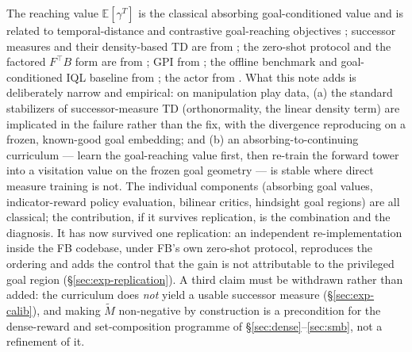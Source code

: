 \documentclass[10pt]{article}
\newcommand{\E}{\mathbb{E}}
\begin{document}
The reaching value $\E[\gamma^{T}]$ is the classical absorbing goal-conditioned value \citep{kaelbling1993learning} and is related to temporal-distance and contrastive goal-reaching objectives \citep{eysenbach2022contrastive}; successor measures and their density-based TD are from \citet{dayan1993improving,blier2021learning}; the zero-shot protocol and the factored $F^\top B$ form are from \citet{touati2021learning,touati2023does}; GPI from \citet{barreto2017successor}; the offline benchmark and goal-conditioned IQL baseline from \citet{park2024ogbench,kostrikov2021offline}; the actor from \citet{park2025flow}.
What this note adds is deliberately narrow and empirical: on manipulation play data,
(a) the standard stabilizers of successor-measure TD (orthonormality, the linear density
term) are implicated in the failure rather than the fix, with the divergence reproducing on
a frozen, known-good goal embedding; and (b) an absorbing-to-continuing curriculum ---
learn the goal-reaching value first, then re-train the forward tower into a visitation
value on the frozen goal geometry --- is stable where direct measure training is not.
The individual components (absorbing goal values, indicator-reward policy evaluation,
bilinear critics, hindsight goal regions) are all classical; the contribution, if it
survives replication, is the combination and the diagnosis.
It has now survived one replication: an independent re-implementation inside the FB
codebase, under FB's own zero-shot protocol, reproduces the ordering and adds the
control that the gain is not attributable to the privileged goal region
(\S\ref{sec:exp-replication}).
A third claim must be withdrawn rather than added: the curriculum does \emph{not}
yield a usable successor measure (\S\ref{sec:exp-calib}), and making $\tilde M$
non-negative by construction is a precondition for the dense-reward and
set-composition programme of \S\ref{sec:dense}--\ref{sec:smb}, not a refinement of it.
\end{document}
